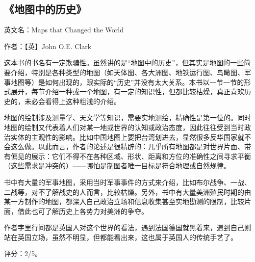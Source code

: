 \subsection{《地图中的历史》}

英文名：Maps that Changed the World

作者：【英】John O.E. Clark

这本书的书名有一定欺骗性。虽然讲的是“地图中的历史”，但其实是地图的一些简要介绍，特别是各种类型的地图（如天体图、各大洲图、地铁运行图、鸟瞰图、军事地图等）是如何出现的，跟实际的“历史”并没有太大关系。本书以一节一节的形式展开，每节介绍一种或一个地图，有一定的知识性，但都比较枯燥，真正喜欢历史的，未必会看得上这种粗浅的介绍。

地图的绘制涉及测量学、天文学等知识，需要实地测绘，精确性是第一位的。同时地图的绘制又代表着人们对某一地或世界的认知或政治态度，因此往往受到当时政治实体的主观性的影响。比如中国地图上要把台湾划进去，显然很多反华国家就不会这么做。以此而言，作者的论述是很精辟的：几乎所有地图都是对世界片面、带有偏见的展示：它们不得不在各种区域、形状、距离和方位的准确性之间寻求平衡（这些需求是冲突的）——哪怕是制图者唯一目标是符合地理或自然规律。

书中有大量的军事地图，采用当时军事事件的方式来介绍，比如布尔战争、一战、二战等，对不了解战史的人而言，比较枯燥。另外，书中有大量美洲殖民时期的由某一方制作的地图，都深入自己政治立场和信息收集甚至实地勘测的限制，比较片面，借此也可了解历史上各势力对美洲的争夺。

作者字里行间都是英国人对这个世界的看法，遇到法国德国就黑着来，遇到自己则站在英国立场，虽然不明显，但都能看出来，这也属于英国人的传统手艺了。

评分：2/5。